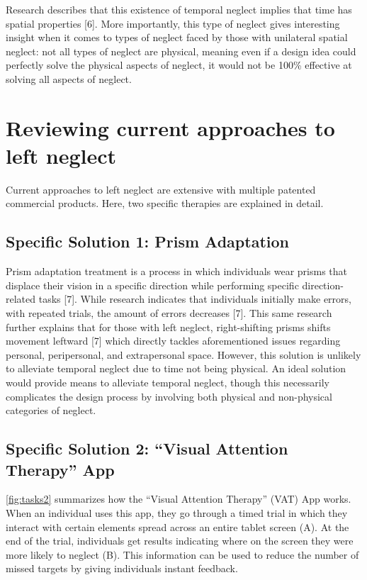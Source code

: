 Research describes that this existence of temporal neglect implies that time
has spatial properties [6]. More importantly, this type of neglect gives
interesting insight when it comes to types of neglect faced by those with
unilateral spatial neglect: not all types of neglect are physical, meaning even
if a design idea could perfectly solve the physical aspects of neglect, it
would not be 100\% effective at solving all aspects of neglect.

\section{Reviewing current approaches to left neglect}

Current approaches to left neglect are extensive with multiple patented
commercial products. Here, two specific therapies are explained in detail.

\subsection{Specific Solution 1: Prism Adaptation}

Prism adaptation treatment is a process in which individuals wear prisms that
displace their vision in a specific direction while performing specific
direction-related tasks [7]. While research indicates that individuals
initially make errors, with repeated trials, the amount of errors decreases
[7]. This same research further explains that for those with left neglect,
right-shifting prisms shifts movement leftward [7] which directly tackles
aforementioned issues regarding personal, peripersonal, and extrapersonal
space. However, this solution is unlikely to alleviate temporal neglect due to
time not being physical. An ideal solution would provide means to alleviate
temporal neglect, though this necessarily complicates the design process by
involving both physical and non-physical categories of neglect.

\subsection{Specific Solution 2: “Visual Attention Therapy” App}

\autoref{fig:tasks2} summarizes how the “Visual Attention Therapy” (VAT) App
works. When an individual uses this app, they go through a timed trial in which
they interact with certain elements spread across an entire tablet screen
(A). At the end of the trial, individuals get results indicating where on the
screen they were more likely to neglect (B). This information can be used to
reduce the number of missed targets by giving individuals instant feedback.

